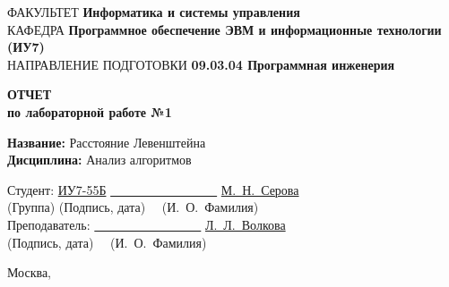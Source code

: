 \begin{titlepage}
	{\doublespacing \small \raggedright ФАКУЛЬТЕТ \hspace{2mm} \textbf{Информатика и системы управления}\\
		КАФЕДРА \hspace{2mm} \textbf{Программное обеспечение ЭВМ и информационные технологии (ИУ7)}\\
		НАПРАВЛЕНИЕ ПОДГОТОВКИ \hspace{2mm} \textbf{09.03.04 Программная инженерия}\\}
	
	\vspace{50mm}
	
	\textbf{ОТЧЕТ}\\
	\textbf{по лабораторной работе №1}\\
	{\doublespacing \small 
	\raggedright \textbf{Название:} \hspace{20mm}Расстояние Левенштейна\\
	
	\textbf{Дисциплина:} 
	\hspace{13mm} Анализ алгоритмов\\
	
	\vspace{50mm}
	
	{\singlespacing Студент: \hspace{20mm} \underline{ИУ7-55Б} \hfill 
	\underline{~~~~~~~~~~~~~~~~~}
	\hspace{5mm}
	\underline{М.~Н.~Серова}\\
	\hspace{40mm} {\tiny (Группа)}\hfill 
	{\tiny (Подпись, дата)~~}
	\hspace{7mm} {\tiny(И.~О.~Фамилия)~~~}\\}
	{\singlespacing Преподаватель:
		\hfill
		\underline{~~~~~~~~~~~~~~~~~}
		\hspace{5mm}
		\underline{Л.~Л.~Волкова}\\
	\hfill 
	{\tiny (Подпись, дата)~~}
	\hspace{7mm} {\tiny(И.~О.~Фамилия)~~~}\\} }
	
	
	\vfill
	
	Москва,	\the\year
	\thispagestyle{empty}
\end{titlepage}